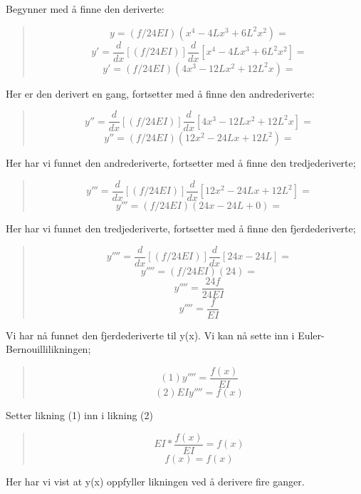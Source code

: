 Begynner med å finne den deriverte:
\begin{quote}
\begin{equation*}
y=(f/24EI)(x^4-4Lx^3+6L^2x^2)=
\end{equation*}
\begin{equation*}
y'=\frac{d}{dx}[(f/24EI)]\frac{d}{dx}[x^4-4Lx^3+6L^2x^2]=
\end{equation*}
\begin{equation*}
y'=(f/24EI)(4x^3-12Lx^2+12L^2x)=
\end{equation*}
\end{quote}
Her er den derivert en gang, fortsetter med å finne den andrederiverte:
\begin{quote}
\begin{equation*}
y''=\frac{d}{dx}[(f/24EI)]\frac{d}{dx}[4x^3-12Lx^2+12L^2x]=
\end{equation*}
\begin{equation*}
y''=(f/24EI)(12x^2-24Lx+12L^2)=
\end{equation*}
\end{quote}
Her har vi funnet den andrederiverte, fortsetter med å finne den tredjederiverte;
\begin{quote}
\begin{equation*}
y'''=\frac{d}{dx}[(f/24EI)]\frac{d}{dx}[12x^2-24Lx+12L^2]=
\end{equation*}
\begin{equation*}
y'''=(f/24EI)(24x-24L+0)=
\end{equation*}
\end{quote}
Her har vi funnet den tredjederiverte, fortsetter med å finne den fjerdederiverte;
\begin{quote}
\begin{equation*}
y''''=\frac{d}{dx}[(f/24EI)]\frac{d}{dx}[24x-24L]=
\end{equation*}
\begin{equation*}
y''''=(f/24EI)(24)=
\end{equation*}
\begin{equation*}
y''''=\frac{24f}{24EI}
\end{equation*}
\begin{equation*}
y''''=\frac{f}{EI}
\end{equation*}
\end{quote}
Vi har nå funnet den fjerdederiverte til y(x). Vi kan nå sette inn i Euler-Bernouillilikningen;
\begin{quote}
\begin{equation*}
(1) y'''' = \frac{f(x)}{EI}
\end{equation*}
\begin{equation*}
(2) EIy'''' = f(x)
\end{equation*}
\end{quote}
Setter likning (1) inn i likning (2)
\begin{quote}
\begin{equation*}
EI*\frac{f(x)}{EI} = f(x)
\end{equation*}
\begin{equation*}
f(x) = f(x)
\end{equation*}
\end{quote}
Her har vi vist at y(x) oppfyller likningen ved å derivere fire ganger.

